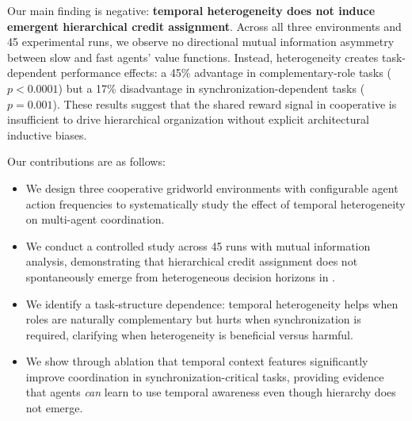 Our main finding is negative: \textbf{temporal heterogeneity does not induce emergent hierarchical credit assignment}. Across all three environments and 45 experimental runs, we observe no directional mutual information asymmetry between slow and fast agents' value functions. Instead, heterogeneity creates task-dependent performance effects: a 45\% advantage in complementary-role tasks ($p < 0.0001$) but a 17\% disadvantage in synchronization-dependent tasks ($p = 0.001$). These results suggest that the shared reward signal in cooperative \marl is insufficient to drive hierarchical organization without explicit architectural inductive biases.

Our contributions are as follows:
\begin{itemize}[leftmargin=*,itemsep=0pt,topsep=0pt]
    \item We design three cooperative gridworld environments with configurable agent action frequencies to systematically study the effect of temporal heterogeneity on multi-agent coordination.
    \item We conduct a controlled study across 45 runs with mutual information analysis, demonstrating that hierarchical credit assignment does not spontaneously emerge from heterogeneous decision horizons in \ippo.
    \item We identify a task-structure dependence: temporal heterogeneity helps when roles are naturally complementary but hurts when synchronization is required, clarifying when heterogeneity is beneficial versus harmful.
    \item We show through ablation that temporal context features significantly improve coordination in synchronization-critical tasks, providing evidence that agents \emph{can} learn to use temporal awareness even though hierarchy does not emerge.
\end{itemize}
